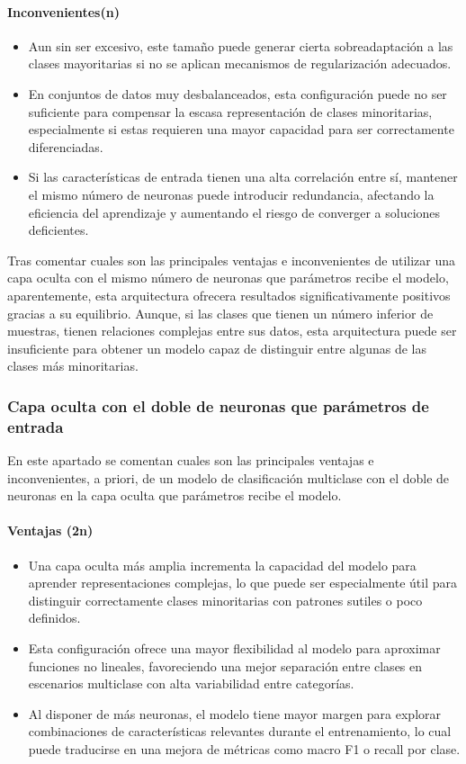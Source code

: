 \paragraph{Inconvenientes(n)}
\begin{itemize}
	\item Aun sin ser excesivo, este tamaño puede generar cierta sobreadaptación a las clases mayoritarias si no se aplican mecanismos de regularización adecuados.
	\item En conjuntos de datos muy desbalanceados, esta configuración puede no ser suficiente para compensar la escasa representación de clases minoritarias, especialmente si estas requieren una mayor capacidad para ser correctamente diferenciadas.
	\item Si las características de entrada tienen una alta correlación entre sí, mantener el mismo número de neuronas puede introducir redundancia, afectando la eficiencia del aprendizaje y aumentando el riesgo de converger a soluciones deficientes.
\end{itemize}

Tras comentar cuales son las principales ventajas e inconvenientes de utilizar una capa oculta con el mismo número de neuronas que parámetros recibe el modelo, aparentemente, esta arquitectura ofrecera resultados significativamente positivos gracias a su equilibrio. Aunque, si las clases que tienen un número inferior de muestras, tienen relaciones complejas entre sus datos, esta arquitectura puede ser insuficiente para obtener un modelo capaz de distinguir entre algunas de las clases más minoritarias.

\subsubsection{Capa oculta con el doble de neuronas que parámetros de entrada}\label{sec:VIMUL98}
En este apartado se comentan cuales son las principales ventajas e inconvenientes, a priori, de un modelo de clasificación multiclase con el doble de neuronas en la capa oculta que parámetros recibe el modelo.

\paragraph{Ventajas (2n)}
\begin{itemize}
	\item Una capa oculta más amplia incrementa la capacidad del modelo para aprender representaciones complejas, lo que puede ser especialmente útil para distinguir correctamente clases minoritarias con patrones sutiles o poco definidos.
	\item Esta configuración ofrece una mayor flexibilidad al modelo para aproximar funciones no lineales, favoreciendo una mejor separación entre clases en escenarios multiclase con alta variabilidad entre categorías.
	\item Al disponer de más neuronas, el modelo tiene mayor margen para explorar combinaciones de características relevantes durante el entrenamiento, lo cual puede traducirse en una mejora de métricas como macro F1 o recall por clase.
\end{itemize}

